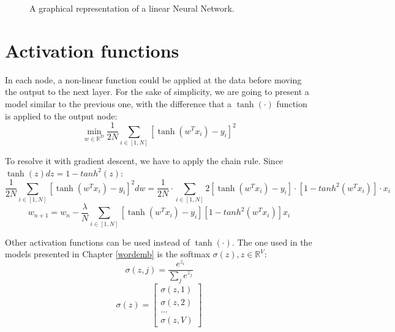 \begin{figure}[h]
    \centering
    \caption{A graphical representation of a linear Neural Network.}
    \label{fig:nn-linear}
\end{figure}

\section{Activation functions}
In each node, a non-linear function could be applied at the data before moving the output to the next layer.
For the sake of simplicity, we are going to present a model similar to the previous one,
with the difference that a $\tanh(\cdot)$ function is applied to the output node:
\[ \displaystyle \min_{w \in \mathbb{R}^D} \frac{1}{2N} \sum_{i \in [1, N]} [\tanh(w^T x_i) - y_i]^2 \]

To resolve it with gradient descent, we have to apply the chain rule.
Since $\tanh(z) dz = 1 - tanh^2(z)$:
\[ \frac{1}{2N} \sum_{i \in [1, N]} [\tanh(w^T x_i) - y_i]^2 dw =
    \frac{1}{2N} \cdot \sum_{i \in [1, N]} 2[\tanh(w^T x_i) - y_i] \cdot [1 - tanh^2(w^T x_i)] \cdot x_i \]
\[ w_{n+1} = w_n -
    \frac{\lambda}{N} \sum_{i \in [1, N]} [\tanh(w^T x_i) - y_i] [1 - tanh^2(w^T x_i)] x_i \]

Other activation functions can be used instead of $\tanh(\cdot)$.
The one used in the models presented in Chapter \ref{wordemb} is the softmax
$\sigma(z), z \in \mathbb{R}^V$:
\[\sigma(z, j) =  \frac{e^{z_i}}{\sum_j e^{z_j}}\]
\[ \sigma(z) =
    \begin{bmatrix}
        \sigma(z, 1) \\ \sigma(z, 2) \\ ... \\ \sigma(z, V)
    \end{bmatrix}
\]

